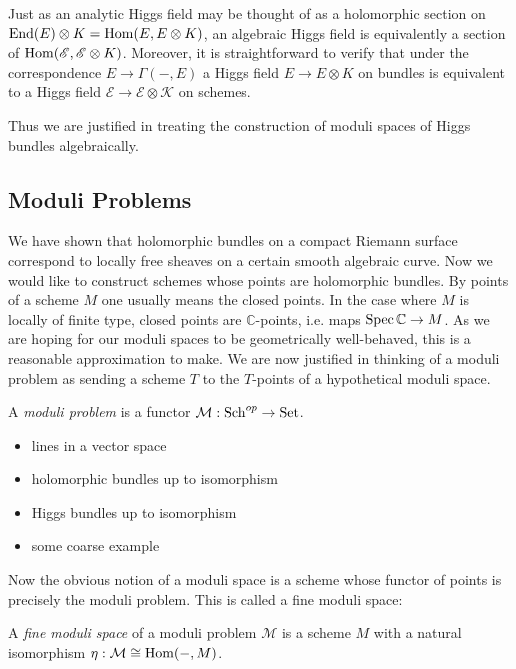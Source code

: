 \documentclass[12pt]{ociamthesis}  %
\begin{document}
Just as an analytic Higgs field may be thought of as a holomorphic
section on $\operatorname{End}(E)\otimes K = \operatorname{Hom}(E,E\otimes K)$, an algebraic
Higgs field is equivalently a section of $\operatorname{Hom}(\mathscr E,\mathscr E\otimes K)$.
Moreover, it is straightforward to verify that under the correspondence
$E\to\Gamma(-,E)$ a Higgs field $E\to E\otimes K$ on bundles is
equivalent to a Higgs field $\mathscr E\to\mathscr E\otimes\mathscr K$
on schemes.

Thus we are justified in treating the construction of moduli
spaces of Higgs bundles algebraically.

\subsection{Moduli Problems}

We have shown that holomorphic bundles on a compact Riemann surface
correspond to locally free sheaves on a certain smooth algebraic
curve. Now we would like to construct schemes whose points are
holomorphic bundles. By points of a scheme $M$ one usually means the
closed points. In the case where $M$ is locally of finite type,
closed points are $\mathbb{C}$-points, i.e. maps
$\operatorname{Spec}\mathbb{C}\to M$. \cite[Corollary 3.36]{gortz2010} As we
are hoping for our moduli spaces to be geometrically well-behaved,
this is a reasonable approximation to make. We are now justified in
thinking of a moduli problem as sending a scheme $T$ to the
$T$-points of a hypothetical moduli space.

\begin{definition}
  A \emph{moduli problem} is a functor $\mathcal M:\operatorname{Sch}^{op}\to\operatorname{Set}$.
\end{definition}

\begin{example}
  \missingexample
  \begin{itemize}
    \item lines in a vector space
    \item holomorphic bundles up to isomorphism
    \item Higgs bundles up to isomorphism
    \item some coarse example
  \end{itemize}
\end{example}

Now the obvious notion of a moduli space is a scheme whose functor
of points is precisely the moduli problem. This is called a fine
moduli space:

\begin{definition}
  A \emph{fine moduli space} of a moduli problem $\mathcal M$
  is a scheme $M$ with a natural isomorphism
  $\eta : \mathcal M \cong \operatorname{Hom}(-,M)$.
\end{definition}
\end{document}
